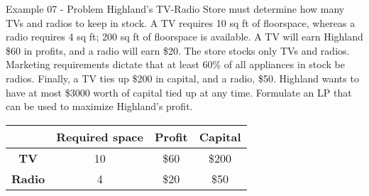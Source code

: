 \begin{frame}{Example 07 - Problem}
Highland's TV-Radio Store must determine how many TVs and radios to keep in 
stock. A TV requires 10 sq ft of floorspace, whereas a radio requires 4 sq ft; 
200 sq ft of floorspace is available. A TV will earn Highland \$60 in profits, 
and a radio will earn \$20. The store stocks only TVs and radios. Marketing 
requirements dictate that at least 60\% of all appliances in stock be radios. 
Finally, a TV ties up \$200 in capital, and a radio, \$50. Highland wants to 
have at most \$3000 worth of capital tied up at any time. Formulate an LP that 
can be used to maximize Highland's profit.

\begin{center}
\begin{tabular}{|c||c|c|c|}
\hline
& \cellcolor{gray90}\textbf{Required space} 
& \cellcolor{gray90}\textbf{Profit} 
& \cellcolor{gray90}\textbf{Capital} \\
\hline
\hline \cellcolor{gray90}\textbf{TV}    & 10 & \$60 & \$200 \\
\hline \cellcolor{gray90}\textbf{Radio} &  4 & \$20 &  \$50 \\
\hline 
\end{tabular}
\end{center}

\end{frame}
